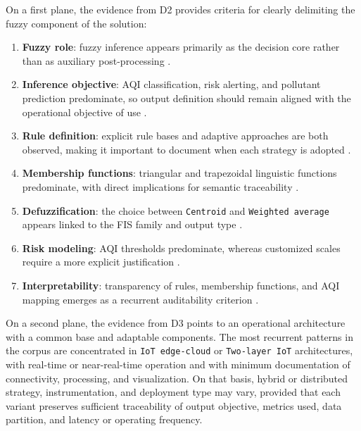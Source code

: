 On a first plane, the evidence from D2 provides criteria for clearly delimiting the fuzzy component of the solution:
\begin{enumerate}
\item \textbf{Fuzzy role}: fuzzy inference appears primarily as the decision core rather than as auxiliary post-processing \cite{A001, A009, A149, A165}.
\item \textbf{Inference objective}: AQI classification, risk alerting, and pollutant prediction predominate, so output definition should remain aligned with the operational objective of use \cite{A009, A135, A165, A168}.
\item \textbf{Rule definition}: explicit rule bases and adaptive approaches are both observed, making it important to document when each strategy is adopted \cite{A132, A149, A144}.
\item \textbf{Membership functions}: triangular and trapezoidal linguistic functions predominate, with direct implications for semantic traceability \cite{A001, A138, A142}.
\item \textbf{Defuzzification}: the choice between \texttt{Centroid} and \texttt{Weighted average} appears linked to the FIS family and output type \cite{A001, A009, A123, A149}.
\item \textbf{Risk modeling}: AQI thresholds predominate, whereas customized scales require a more explicit justification \cite{A001, A114, A142, A178}.
\item \textbf{Interpretability}: transparency of rules, membership functions, and AQI mapping emerges as a recurrent auditability criterion \cite{A149, A165, A167}.
\end{enumerate}

On a second plane, the evidence from D3 points to an operational architecture with a common base and adaptable components. The most recurrent patterns in the corpus are concentrated in \texttt{IoT edge-cloud} or \texttt{Two-layer IoT} architectures, with real-time or near-real-time operation and with minimum documentation of connectivity, processing, and visualization. On that basis, hybrid or distributed strategy, instrumentation, and deployment type may vary, provided that each variant preserves sufficient traceability of output objective, metrics used, data partition, and latency or operating frequency.

